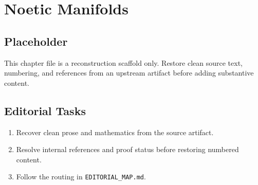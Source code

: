 \chapter{Noetic Manifolds}
\label{chap:noetic-manifolds}

\section*{Placeholder}
This chapter file is a reconstruction scaffold only. Restore clean source text, numbering, and references from an upstream artifact before adding substantive content.

\section*{Editorial Tasks}
\begin{enumerate}
\item Recover clean prose and mathematics from the source artifact.
\item Resolve internal references and proof status before restoring numbered content.
\item Follow the routing in \texttt{EDITORIAL\_MAP.md}.
\end{enumerate}
